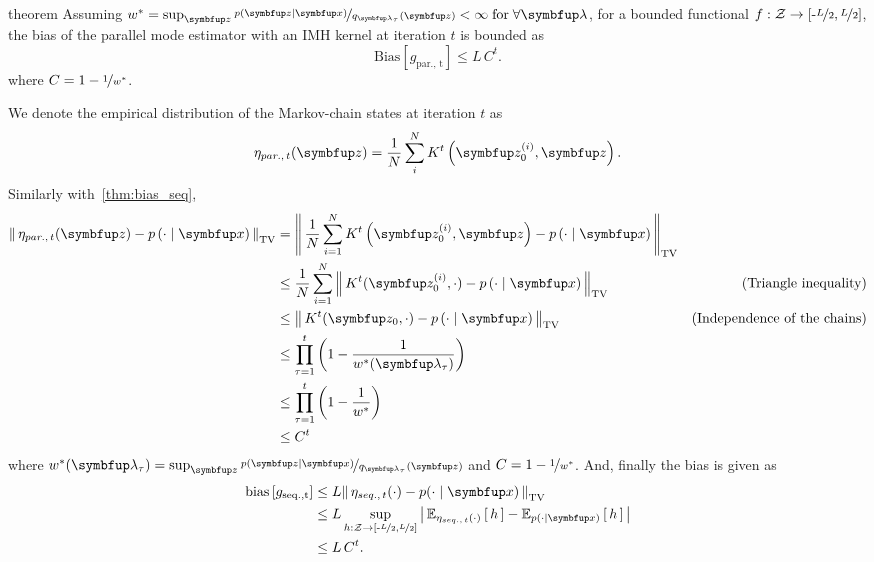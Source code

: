 
\begin{theoremEnd}{theorem}
  Assuming \(w^* = \sup_{\vz} \nicefrac{p\left(\vz\mid\vx\right)}{q_{\vlambda_{\tau}}\left(\vz\right)} < \infty \; \text{for}\;\forall \vlambda \), for a bounded functional \(f : \mathcal{Z} \rightarrow [\text{-}\nicefrac{L}{2},\nicefrac{L}{2}]\), the bias of the parallel mode estimator with an IMH kernel at iteration \(t\) is bounded as
  {\small
\[
    \mathrm{Bias}\left[ g_{\mathrm{par.,\, t}} \right] \leq L\,C^t.
\]
  }
  where \(C = 1 - \nicefrac{1}{w^*}\).
\end{theoremEnd}
\begin{proofEnd}
  We denote the empirical distribution of the Markov-chain states at iteration \(t\) as
  \begin{align}
    \eta_{par.,\, t}(\vz) = \frac{1}{N} \sum_{i}^N K^{t}\left(\vz_0^{(i)}, \vz\right).
  \end{align}
  Similarly with~\cref{thm:bias_seq}, 
  \begin{align}
    \DTV{ \eta_{par.,\, t}(\vz) }{p\left(\cdot\mid\vx\right)}
    &= \DTV{\frac{1}{N} \sum_{i=1}^N K^{t}\left(\vz_0^{(i)}, \vz\right)}{p\left(\cdot\mid\vx\right)} \\
    &\leq \frac{1}{N} \sum_{i=1}^N  \DTV{K^t(\vz_0^{(i)}, \cdot)}{p\left(\cdot\mid\vx\right)} &\text{(Triangle inequality)} \\
    &\leq \DTV{K^t(\vz_0, \cdot)}{p\left(\cdot\mid\vx\right)} &\text{(Independence of the chains)} \\
    &\leq \prod_{\tau=1}^t {\left(1 - \frac{1}{w^*(\vlambda_{\tau})}\right)} \\
    &\leq \prod_{\tau=1}^t {\left(1 - \frac{1}{w^*}\right)} \\
    &\leq C^t
  \end{align}
  where \(w^*(\vlambda_{\tau}) = \sup_{\vz} \nicefrac{p\left(\vz\mid\vx\right)}{q_{\vlambda_{\tau}}\left(\vz\right)} \) and \(C = 1 - \nicefrac{1}{w^*}\).
  And, finally the bias is given as
 \begin{align}
   \mathrm{bias}\left[ g_{\mathrm{seq., t}} \right]
   &\leq L \DTV{\eta_{seq.,\, t}(\cdot)}{p(\cdot\mid\vx)} \\
   &\leq L \sup_{h : \mathcal{Z} \rightarrow \left[ \text{-}\nicefrac{L}{2}, \nicefrac{L}{2} \right]} \left|\, \Esub{\eta_{seq.,\, t}(\cdot)}{h} - \Esub{p(\cdot\mid\vx)}{h} \,\right| \\
   &\leq L \, C^t.
 \end{align}
\end{proofEnd}

